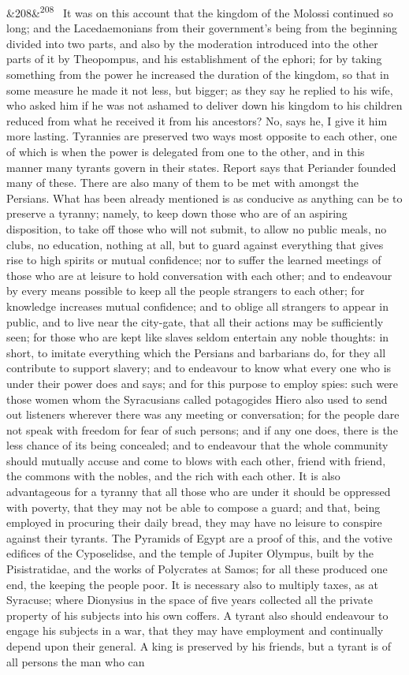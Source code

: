 \documentclass[12pt]{article}
\newcommand{\para}[1][]{\par\noindent\ifx&#1&\else\textsuperscript{\footnotesize #1}~\fi}
\begin{document}
\para[208] It was on this account that the kingdom of the Molossi continued so long; and the Lacedaemonians from their government's being from the beginning divided into two parts, and also by the moderation introduced into the other parts of it by Theopompus, and his establishment of the ephori; for by taking something from the power he increased the duration of the kingdom, so that in some measure he made it not less, but bigger; as they say he replied to his wife, who asked him if he was not ashamed to deliver down his kingdom to his children reduced from what he received it from his ancestors? No, says he, I give it him more lasting. Tyrannies are preserved two ways most opposite to each other, one of which is when the power is delegated from one to the other, and in this manner many tyrants govern in their states. Report says that Periander founded many of these. There are also many of them to be met with amongst the Persians. What has been already mentioned is as conducive as anything can be to preserve a tyranny; namely, to keep down those who are of an aspiring disposition, to take off those who will not submit, to allow no public meals, no clubs, no education, nothing at all, but to guard against everything that gives rise to high spirits or mutual confidence; nor to suffer the learned meetings of those who are at leisure to hold conversation with each other; and to endeavour by every means possible to keep all the people strangers to each other; for knowledge increases mutual confidence; and to oblige all strangers to appear in public, and to live near the city-gate, that all their actions may be sufficiently seen; for those who are kept like slaves seldom entertain any noble thoughts: in short, to imitate everything which the Persians and barbarians do, for they all contribute to support slavery; and to endeavour to know what every one who is under their power does and says; and for this purpose to employ spies: such were those women whom the Syracusians called potagogides Hiero also used to send out listeners wherever there was any meeting or conversation; for the people dare not speak with freedom for fear of such persons; and if any one does, there is the less chance of its being concealed; and to endeavour that the whole community should mutually accuse and come to blows with each other, friend with friend, the commons with the nobles, and the rich with each other. It is also advantageous for a tyranny that all those who are under it should be oppressed with poverty, that they may not be able to compose a guard; and that, being employed in procuring their daily bread, they may have no leisure to conspire against their tyrants. The Pyramids of Egypt are a proof of this, and the votive edifices of the Cyposelidse, and the temple of Jupiter Olympus, built by the Pisistratidae, and the works of Polycrates at Samos; for all these produced one end, the keeping the people poor. It is necessary also to multiply taxes, as at Syracuse; where Dionysius in the space of five years collected all the private property of his subjects into his own coffers. A tyrant also should endeavour to engage his subjects in a war, that they may have employment and continually depend upon their general. A king is preserved by his friends, but a tyrant is of all persons the man who can 
\end{document}
